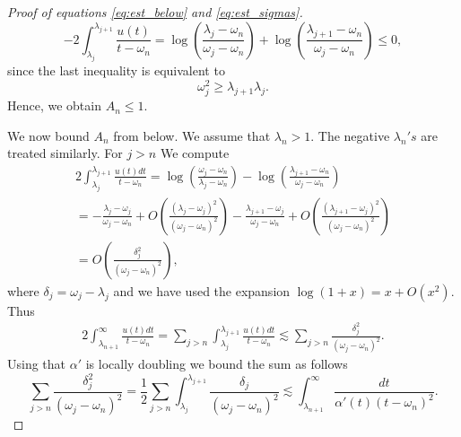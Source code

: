 \documentclass{article}[12pt]
\theoremstyle{remark}
\begin{document}
\begin{proof}[Proof of equations \eqref{eq:est_below} and \eqref{eq:est_sigmas}]
            \begin{equation*}
                -2\int_{\lambda_{j}}^{\lambda_{j+1}} \frac{u(t)}{t-\omega_{n}} = \log\left( \frac{\lambda_{j}-\omega_{n}}{\omega_{j}-\omega_{n}}\right) + \log\left( \frac{\lambda_{j+1}-\omega_{n}}{\omega_{j}-\omega_{n}}\right) \leq 0,
            \end{equation*}
            since the last inequality is equivalent to
            \begin{equation*}
                \omega_{j}^{2} \geq \lambda_{j+1}\lambda_{j}.    
            \end{equation*}
            Hence, we obtain $A_{n} \leq 1$.
            
            
            We now bound $A_{n}$ from below. We assume that $\lambda_{n} > 1$. The negative $\lambda_{n}'s$ are treated similarly. For $j > n$ We compute
            \begin{equation*}
                \begin{split}
                    2\int_{\lambda_{j}}^{\lambda_{j+1}} \frac{u(t)dt}{t-\omega_{n}} = \log(\frac{\omega_{j}-\omega_{n}}{\lambda_{j}-\omega_{n}}) - \log(\frac{\lambda_{j+1}-\omega_{n}}{\omega_{j}-\omega_{n}}) \\= -\frac{\lambda_{j}-\omega_{j}}{\omega_{j}-\omega_{n}} + O\left(\frac{(\lambda_{j}-\omega_{j})^{2}}{(\omega_{j}-\omega_{n})^{2}}\right)- \frac{\lambda_{j+1}-\omega_{j}}{\omega_{j}-\omega_{n}} + O\left(\frac{(\lambda_{j+1}-\omega_{j})^{2}}{(\omega_{j}-\omega_{n})^{2}}\right)\\ = O\left( \frac{\delta_{j}^{2}}{(\omega_{j}-\omega_{n})^{2}}\right),
                \end{split}
            \end{equation*}
            where $\delta_{j} = \omega_{j}-\lambda_{j}$ and we have used the expansion $\log(1+x) = x +O(x^{2})$. Thus
            \begin{equation*}
                \begin{split}
                    2\int_{\lambda_{n+1}}^{\infty} \frac{u(t)dt}{t-\omega_{n}} = \sum_{j > n} \int_{\lambda_{j}}^{\lambda_{j+1}}\frac{u(t)dt}{t-\omega_{n}} \lesssim \sum_{j > n} \frac{\delta_{j}^{2}}{(\omega_{j}-\omega_{n})^{2}}.
                \end{split}
            \end{equation*}
            Using that $\alpha'$ is locally doubling we bound the sum as follows 
            \begin{equation*}
                \sum_{j > n} \frac{\delta_{j}^{2}}{(\omega_{j}-\omega_{n})^{2}} = \frac{1}{2}\sum_{j > n} \int_{\lambda_{j}}^{\lambda_{j+1}} \frac{\delta_{j}}{(\omega_{j}-\omega_{n})^{2}} \lesssim \int_{\lambda_{n+1}}^{\infty} \frac{dt}{\alpha'(t)(t-\omega_{n})^{2}}.

\end{equation*}
\end{proof}
\end{document}
